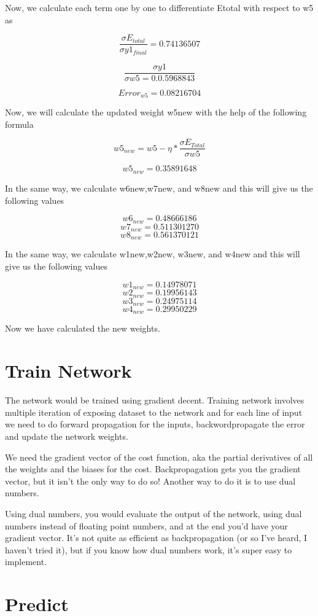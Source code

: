 \documentclass[12pt]{article}
\begin{document}
Now, we calculate each term one by one to differentiate Etotal with respect to w5 as


\[\frac{\sigma E_{total}}{\sigma y1_{final}}=0.74136507\]

\[\frac{\sigma y1}{\sigma w5=0.0.5968843}\]
	
\[Error_{w5}=0.08216704\]

Now, we will calculate the updated weight w5new with the help of the following formula

\[w5_{new}=w5-\eta *\frac{\sigma E_{Total}}{\sigma w5}\]

\[w5_{new}=0.35891648\]

In the same way, we calculate w6new,w7new, and w8new and this will give us the following values

\[w6_{new}=0.48666186\]
\[w7_{new}=0.511301270\]
\[w8_{new}=0.561370121\]


In the same way, we calculate w1new,w2new, w3new, and w4new and this will give us the following values


\[w1_{new}=0.14978071\]
\[w2_{new}=0.19956143\]
\[w3_{new}=0.24975114\]
\[w4_{new}=0.29950229\]

Now we have calculated the new weights.


\section{Train Network}

The network would be trained using gradient decent. Training network involves multiple iteration of exposing dataset to the network and for each line of input we need to do forward propagation for the inputs, backwordpropagate the error and update the network weights.

We need the gradient vector of the cost function, aka the partial derivatives of all the weights and the biases for the cost. Backpropagation gets you the gradient vector, but it isn’t the only way to do so! Another way to do it is to use dual numbers. 

Using dual numbers, you would evaluate the output of the network, using dual numbers instead of floating point numbers, and at the end you’d have your gradient vector. It’s not quite as efficient as backpropagation (or so I’ve heard, I haven’t tried it), but if you know how dual numbers work, it’s super easy to implement.


\section{Predict}
\end{document}
